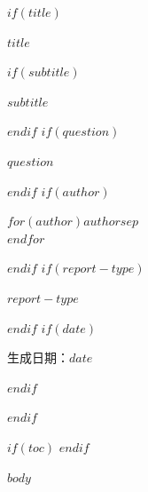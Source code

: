 \documentclass[UTF8,a4paper,11pt,fontset=none]{ctexart}
\begin{document}
$if(title)$
\begin{titlepage}
  \thispagestyle{empty}
  \centering
  \vspace*{0.16\textheight}
  {\sffamily\bfseries\fontsize{27}{38}\selectfont $title$\par}
  $if(subtitle)$
  \vspace{1.4cm}
  {\fontsize{16}{24}\selectfont $subtitle$\par}
  $endif$
  $if(question)$
  \vspace{2.6cm}
  \begin{questionbox}
    $question$
  \end{questionbox}
  $endif$
  \vfill
  $if(author)$
  {\large $for(author)$$author$$sep$\\$endfor$\par}
  \vspace{0.7cm}
  $endif$
  $if(report-type)$
  {\large $report-type$\par}
  \vspace{0.7cm}
  $endif$
  $if(date)$
  {\large 生成日期：$date$\par}
  $endif$
\end{titlepage}
$endif$

$if(toc)$
\tableofcontents
\clearpage
$endif$

$body$
\end{document}

